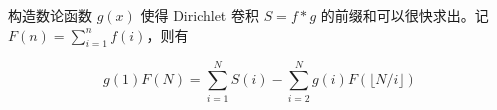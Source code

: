 构造数论函数 $g(x)$ 使得 Dirichlet 卷积 $S=f*g$ 的前缀和可以很快求出。记 $F(n)=\sum_{i=1}^n f(i)$，则有

$$
g(1)F(N) = \sum_{i=1}^{N} S(i) - \sum_{i=2}^{N} g(i)F( \lfloor N/i \rfloor )
$$
